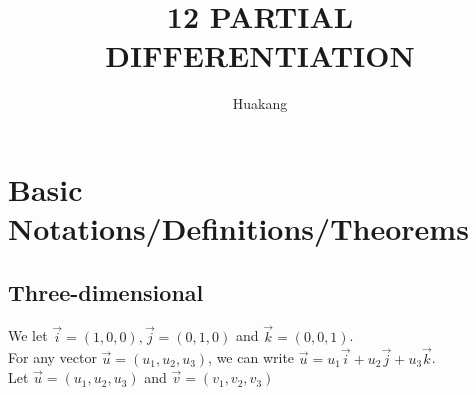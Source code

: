 \documentclass{article}
\title{12 PARTIAL DIFFERENTIATION}
\author{Huakang}
\begin{document}
    \maketitle

    \section{Basic Notations/Definitions/Theorems}

    \subsection{Three-dimensional}
    We let $\vec{i}=(1,0,0),\vec{j}=(0,1,0)$ and $\vec{k}=(0,0,1)$.\\
    For any vector $\vec{u}=(u_1,u_2,u_3)$, we can write $\vec{u}=u_1\vec{i}+u_2\vec{j}+u_3\vec{k}$.\\
    Let $\vec{u}=(u_1,u_2,u_3)$ and $\vec{v}=(v_1,v_2,v_3)$
\end{document}
